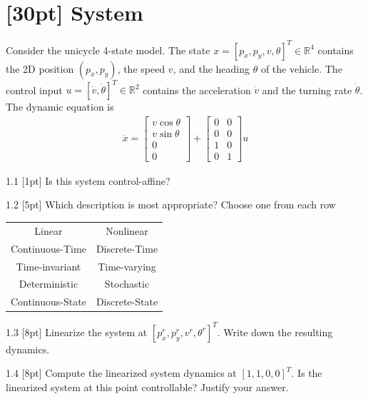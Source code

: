 \section{[30pt] System}
Consider the unicycle 4-state model. The state $x = [p_x,p_y,v,\theta]^T\in\mathbb{R}^4$ contains the 2D position $(p_x,p_y)$, the speed $v$, and the heading $\theta$ of the vehicle. The control input $u=[\dot v, \dot \theta]^T\in\mathbb{R}^2$ contains the acceleration $\dot v$ and the turning rate $\dot\theta$. The dynamic equation is
\begin{eqnarray}\label{eq: dynamics}
\dot x = \left[\begin{array}{c}
v\cos\theta\\
v\sin\theta\\
0\\
0
\end{array} \right] + \left[\begin{array}{cc}
0 & 0\\
0 & 0\\
1 & 0\\
0 & 1
\end{array} \right] u
\end{eqnarray}

{1.1 [1pt] Is this system control-affine?}

\solution{}

{1.2 [5pt] Which description is most appropriate? Choose one from each row}
\begin{center}
    \begin{tabular}{cc}
Linear &   Nonlinear\\
Continuous-Time & Discrete-Time\\
Time-invariant & Time-varying\\
Deterministic & Stochastic\\
Continuous-State & Discrete-State
\end{tabular}
\end{center}

\solution{}


{1.3 [8pt] Linearize the system at $[p_x^r,p_y^r,v^r,\theta^r]^T$. Write down the resulting dynamics.}

\solution{}


{1.4 [8pt] Compute the linearized system dynamics at $[1,1,0,0]^T$. Is the linearized system at this point controllable? Justify your answer.}

